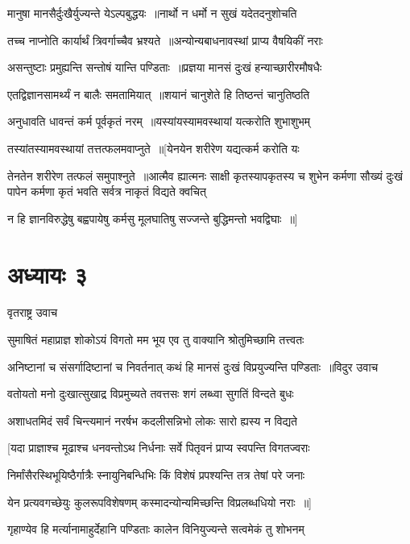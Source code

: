 \twolineshloka
{मानुषा मानसैर्दुःखैर्युज्यन्ते येऽल्पबुद्धयः ॥नार्थो न धर्मो न सुखं यदेतदनुशोचति}
{}


\twolineshloka
{तच्च नाप्नोति कार्यार्थं त्रिवर्गाच्चैव भ्रश्यते ॥अन्योन्यबाधनावस्थां प्राप्य वैषयिकीं नराः}
{}


\twolineshloka
{असन्तुष्टाः प्रमुह्यन्ति सन्तोषं यान्ति पण्डिताः ॥प्रज्ञया मानसं दुःखं हन्याच्छारीरमौषधैः}
{}


\twolineshloka
{एतद्विज्ञानसामर्थ्यं न बालैः समतामियात् ॥शयानं चानुशेते हि तिष्ठन्तं चानुतिष्ठति}
{}


\twolineshloka
{अनुधावति धावन्तं कर्म पूर्वकृतं नरम् ॥यस्यांयस्यामवस्थायां यत्करोति शुभाशुभम्}
{}


\twolineshloka
{तस्यांतस्यामवस्थायां तत्तत्फलमवाप्नुते ॥[येनयेन शरीरेण यद्यत्कर्म करोति यः}
{}


तेनतेन शरीरेण तत्फलं समुपाश्नुते ॥आत्मैव ह्यात्मनः साक्षी कृतस्यापकृतस्य च
\twolineshloka
{शुभेन कर्मणा सौख्यं दुःखं पापेन कर्मणा}
{कृतं भवति सर्वत्र नाकृतं विद्यते क्वचित्}


\twolineshloka
{न हि ज्ञानविरुद्धेषु बह्वपायेषु कर्मसु}
{मूलघातिषु सज्जन्ते बुद्धिमन्तो भवद्विघाः ॥]}


\chapter{अध्यायः ३}
\twolineshloka
{वृतराष्ट्र उवाच}
{}


\twolineshloka
{सुमाषितं महाप्राज्ञ शोकोऽयं विगतो मम}
{भूय एव तु वाक्यानि श्रोतुमिच्छामि तत्त्वतः}


\threelineshloka
{अनिष्टानां च संसर्गादिष्टानां च निवर्तनात्}
{कथं हि मानसं दुःखं विप्रयुज्यन्ति पण्डिताः ॥विदुर उवाच}
{}


\twolineshloka
{वतोयतो मनो दुःखात्सुखाद्र विप्रमुच्यते}
{तवत्तसः शगं लब्ध्वा सुगतिं विन्दते बुधः}


\twolineshloka
{अशाधतमिदं सर्वं चिन्त्यमानं नरर्षभ}
{कदलीसन्निभो लोकः सारो ह्यस्य न विद्यते}


\twolineshloka
{[यदा प्राज्ञाश्च मूढाश्च धनवन्तोऽथ निर्धनाः}
{सर्वे पितृवनं प्राप्य स्वपन्ति विगतज्वराः}


\twolineshloka
{निर्मांसैरस्थिभूयिष्ठैर्गात्रैः स्नायुनिबन्धिभिः}
{किं विशेषं प्रपश्यन्ति तत्र तेषां परे जनाः}


\twolineshloka
{येन प्रत्यवगच्छेयुः कुलरूपविशेषणम्}
{कस्मादन्योन्यमिच्छन्ति विप्रलब्धधियो नराः ॥]}


\twolineshloka
{गृहाण्येव हि मर्त्यानामाहुर्देहानि पण्डिताः}
{कालेन विनियुज्यन्ते सत्वमेकं तु शोभनम्}


